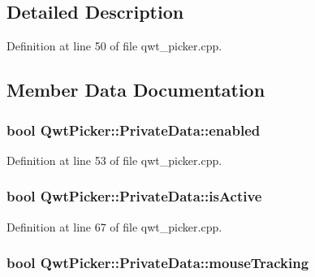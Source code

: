 \subsection{Detailed Description}


Definition at line 50 of file qwt\-\_\-picker.\-cpp.



\subsection{Member Data Documentation}
\hypertarget{class_qwt_picker_1_1_private_data_ab93a9a6c04e5bf1fa85320b748b31acf}{
\subsubsection[{enabled}]{\setlength{\rightskip}{0pt plus 5cm}bool Qwt\-Picker\-::\-Private\-Data\-::enabled}}\label{class_qwt_picker_1_1_private_data_ab93a9a6c04e5bf1fa85320b748b31acf}


Definition at line 53 of file qwt\-\_\-picker.\-cpp.

\hypertarget{class_qwt_picker_1_1_private_data_a9d2e98c1b11757a80d77c564cca8e2e3}{
\subsubsection[{is\-Active}]{\setlength{\rightskip}{0pt plus 5cm}bool Qwt\-Picker\-::\-Private\-Data\-::is\-Active}}\label{class_qwt_picker_1_1_private_data_a9d2e98c1b11757a80d77c564cca8e2e3}


Definition at line 67 of file qwt\-\_\-picker.\-cpp.

\hypertarget{class_qwt_picker_1_1_private_data_aa580a96bd2d1d392fb903c7a846fba76}{
\subsubsection[{mouse\-Tracking}]{\setlength{\rightskip}{0pt plus 5cm}bool Qwt\-Picker\-::\-Private\-Data\-::mouse\-Tracking}}\label{class_qwt_picker_1_1_private_data_aa580a96bd2d1d392fb903c7a846fba76}



